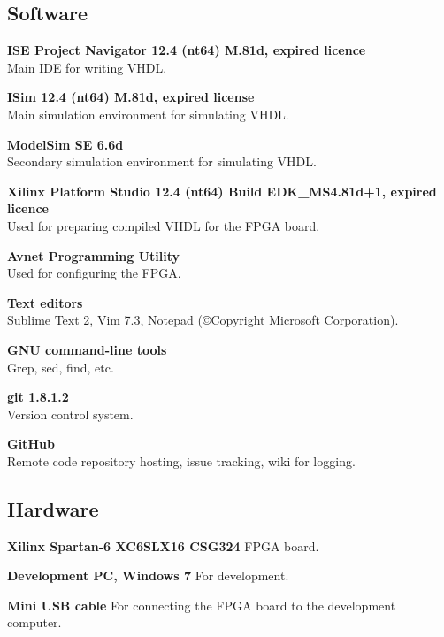\subsection{Software}
\begin{description}
    \item{\textbf{ISE Project Navigator 12.4 (nt64) M.81d, expired licence}} \\
        Main IDE for writing VHDL.
    \item{\textbf{ISim 12.4 (nt64) M.81d, expired license}} \\
        Main simulation environment for simulating VHDL.
    \item{\textbf{ModelSim SE 6.6d}} \\
        Secondary simulation environment for simulating VHDL.
    \item{\textbf{Xilinx Platform Studio 12.4 (nt64) Build EDK\_MS4.81d+1, expired licence}} \\
        Used for preparing compiled VHDL for the FPGA board.
    \item{\textbf{Avnet Programming Utility}} \\
        Used for configuring the FPGA.
    \item{\textbf{Text editors}} \\
        Sublime Text 2, Vim 7.3, Notepad (©Copyright Microsoft Corporation).
    \item{\textbf{GNU command-line tools}} \\
        Grep, sed, find, etc.
    \item{\textbf{git 1.8.1.2}} \\
        Version control system.
    \item{\textbf{GitHub}} \\
        Remote code repository hosting, issue tracking, wiki for logging.
\end{description}

\subsection{Hardware}
\begin{description}
\item{\textbf{Xilinx Spartan-6 XC6SLX16 CSG324}}
    FPGA board.
\item{\textbf{Development PC, Windows 7}}
    For development.
\item{\textbf{Mini USB cable}}
    For connecting the FPGA board to the development computer.
\end{description}

\bigskip

